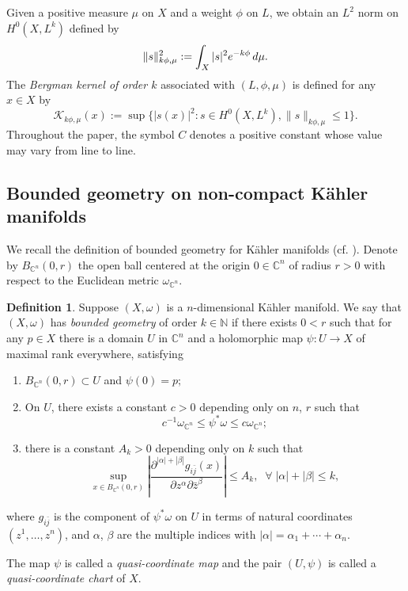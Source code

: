 \documentclass[a4paper, 11pt]{amsart}
\theoremstyle{plain}
\numberwithin{equation}{section} %
\numberwithin{figure}{section} %
\theoremstyle{plain}
\theoremstyle{plain}
\theoremstyle{plain}
\theoremstyle{plain}
\theoremstyle{remark}
\theoremstyle{definition}
\theoremstyle{definition}
\newtheorem{definition}[theorem]{Definition}
\newcommand{\K}{\mathcal{K}}
\begin{document}
 

Given a positive measure $\mu$ on $X$ and a weight $\phi$ on $L$, we obtain an $L^2$ norm on $H^0(X,L^k)$ defined by
\[ \|s\|^2_{k\phi,\mu}:=\int_X|s|^2e^{-k\phi} \,{\rm d}\mu.\]
The {\em Bergman kernel of order $k$} associated with $(L,\phi,\mu)$ is defined for any $x\in X$ by 
\[ \K_{k\phi,\mu}(x):=\sup\{|s(x)|^2: s\in H^0(X,L^k) , \|s\|_{k\phi,\mu}\leq 1\}.\]
Throughout the paper, the symbol $C$ denotes a positive constant whose value may vary from line to line.




\subsection{Bounded geometry on non-compact K\"ahler manifolds}
We recall the definition of bounded geometry for  K\"ahler manifolds (cf. \cite{Kobayashi84-KE-open,ChengYau80-complete,Wu-Yau20invariant}). Denote by $B_{\mathbb{C}^n}(0,r)$ the open ball centered at the origin $0\in\mathbb{C}^n$ of radius $r>0$ with respect to the Euclidean metric $\omega_{\mathbb{C}^n}$.
\begin{definition}\label{def:bd_geo}
Suppose $(X,\omega)$ is a $n$-dimensional K\"ahler manifold. We say that $(X,\omega)$ has {\em bounded geometry} of order $k\in\mathbb{N}$ if there exists $0<r$ such that for any $p\in X$ there is  a domain $U$ in $\mathbb{C}^n$ and a  holomorphic map   $\psi:U  \rightarrow X $ of maximal rank everywhere,  satisfying 
\begin{enumerate}
    \item $B_{\mathbb{C}^n}(0,r)\subset U $ and $\psi(0)=p;$
    
    \item  On $U$, there exists a constant $c>0$ depending only on $n$, $r$ such that $$c^{-1}\omega_{\mathbb{C}^n}\leq \psi^*\omega \leq c\omega_{\mathbb{C}^n };$$
    \item  there is a constant $A_k>0$ depending only on $k$ such that
$$\sup_{x\in B_{\mathbb{C}^n}(0,r)}\left| \frac{\partial^{|\alpha|+|\beta|}g_{i\bar j}(x)}{\partial z^\alpha \partial \bar z^\beta}\right|\leq A_k, \;\;\forall\;|\alpha|+|\beta|\leq k,$$
\end{enumerate}
where $g_{i\bar j}$ is the component of $\psi^*\omega$ on $U$ in terms of natural coordinates $(z^1, \ldots ,z^n)$, and $\alpha$, $\beta$ are the multiple indices with $|\alpha|=\alpha_1+\cdots+\alpha_n$.

The map $\psi$ is called a {\em quasi-coordinate map} and the pair $(U,\psi)$ is called a {\em quasi-coordinate chart} of $X$. %
\end{definition}
\end{document}
